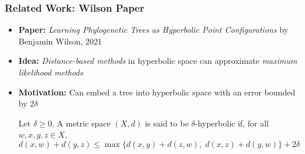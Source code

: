 \documentclass[
	11pt, %
]{beamer}
\begin{document}

\begin{frame}
	\frametitle{Related Work: Wilson Paper}

	\begin{itemize}
		\item \textbf{Paper:} \textit{Learning Phylogenetic Trees as Hyperbolic Point Configurations} by Benjamin Wilson, 2021  
		\item \textbf{Idea:} \emph{Distance-based methods} in hyperbolic space can approximate \emph{maximum likelihood methods}
		\item \textbf{Motivation:} Can embed a tree into hyperbolic space with an error bounded by $2\delta$
		
		\begin{theorem}
			Let $\delta \geq 0$. A metric space $(X, d)$ is said to be $\delta$-hyperbolic if, for all $w,x,y,z \in X$,
			\begin{equation*}
				d(x,w) + d(y,z) \leq \max \big\{d(x,y) + d(z,w), \; d(x,z) + d(y,w) \big\} + 2 \delta
			\end{equation*}
		\end{theorem}

	\end{itemize}
\end{frame}

\end{document}
